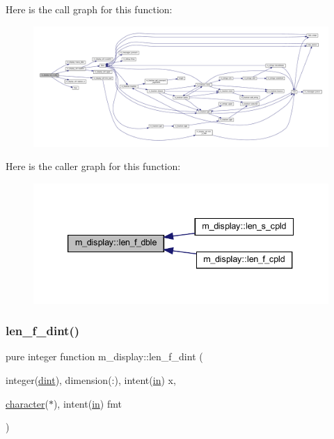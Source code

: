 Here is the call graph for this function\+:
\nopagebreak
\begin{figure}[H]
\begin{center}
\leavevmode
\includegraphics[width=350pt]{namespacem__display_aa013a639d5b0f7e40b627c9d712693f0_cgraph}
\end{center}
\end{figure}
Here is the caller graph for this function\+:
\nopagebreak
\begin{figure}[H]
\begin{center}
\leavevmode
\includegraphics[width=339pt]{namespacem__display_aa013a639d5b0f7e40b627c9d712693f0_icgraph}
\end{center}
\end{figure}
\mbox{\label{namespacem__display_a6a2709cf5f243ee492f223b40c6b5143}} 
\subsubsection{\texorpdfstring{len\+\_\+f\+\_\+dint()}{len\_f\_dint()}}
{\footnotesize\ttfamily pure integer function m\+\_\+display\+::len\+\_\+f\+\_\+dint (\begin{DoxyParamCaption}\item[{integer(\hyperlink{namespacem__display_a73f772e9702cad6f40b78364fde2c7cd}{dint}), dimension(\+:), intent(\hyperlink{M__journal_83_8txt_afce72651d1eed785a2132bee863b2f38}{in})}]{x,  }\item[{\hyperlink{option__stopwatch_83_8txt_abd4b21fbbd175834027b5224bfe97e66}{character}($\ast$), intent(\hyperlink{M__journal_83_8txt_afce72651d1eed785a2132bee863b2f38}{in})}]{fmt }\end{DoxyParamCaption})\hspace{0.3cm}{\ttfamily [private]}}




